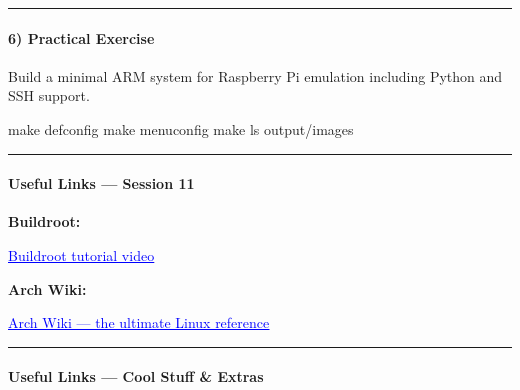 \documentclass[
  english,
  paper=a4,
  oneside  ,captions=tableheading
]{scrartcl}
\newenvironment{Shaded}{}{}
\newcommand{\FunctionTok}[1]{\textcolor[rgb]{0.02,0.16,0.49}{#1}}
\newcommand{\NormalTok}[1]{#1}
\begin{document}
\begin{center}\rule{0.5\linewidth}{0.5pt}\end{center}

\paragraph{6) Practical Exercise}\label{practical-exercise}

Build a minimal ARM system for Raspberry Pi emulation including Python
and SSH support.

\begin{Shaded}
\begin{Highlighting}[]
\FunctionTok{make}\NormalTok{ defconfig}
\FunctionTok{make}\NormalTok{ menuconfig}
\FunctionTok{make}
\FunctionTok{ls}\NormalTok{ output/images}
\end{Highlighting}
\end{Shaded}

\begin{center}\rule{0.5\linewidth}{0.5pt}\end{center}

\paragraph{Useful Links --- Session 11}\label{useful-links-session-11}

\textbf{Buildroot:}

%
  \par\vspace{0.5ex}%
  \href{https://youtu.be/ey3sKdOmPa8?si=H0kdd-9R5Id4XoXy}{\textcolor{blue}{\underline{\faLink\quad Buildroot tutorial video}}}%
  \par\vspace{0.5ex}%

\textbf{Arch Wiki:}

%
  \par\vspace{0.5ex}%
  \href{https://wiki.archlinux.org/}{\textcolor{blue}{\underline{\faLink\quad Arch Wiki — the ultimate Linux reference}}}%
  \par\vspace{0.5ex}%

\begin{center}\rule{0.5\linewidth}{0.5pt}\end{center}

\paragraph{Useful Links --- Cool Stuff \&
Extras}\label{useful-links-cool-stuff-extras}
\end{document}
